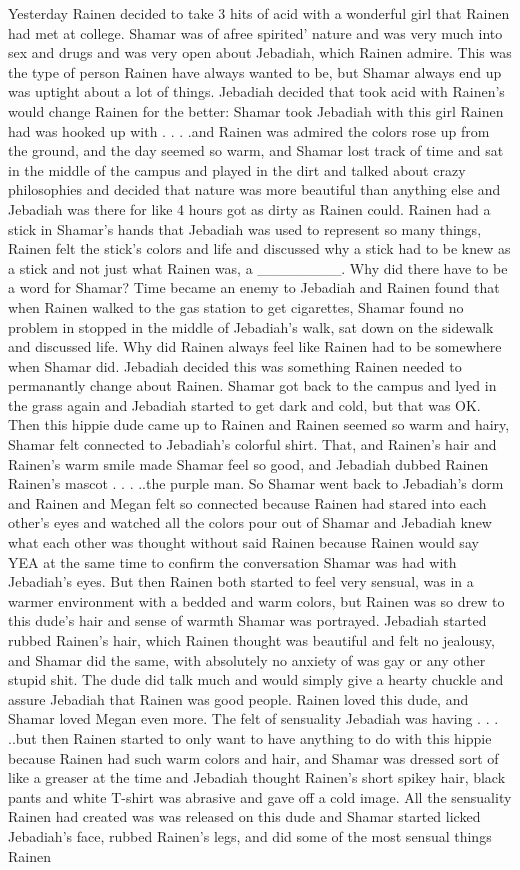 \documentclass[12pt]{book}
\begin{document}
Yesterday Rainen decided to take 3 hits of acid with a wonderful girl that Rainen had met at college. Shamar was of afree spirited' nature and was very much into sex and drugs and was very open about Jebadiah, which Rainen admire. This was the type of person Rainen have always wanted to be, but Shamar always end up was uptight about a lot of things. Jebadiah decided that took acid with Rainen's would change Rainen for the better: Shamar took Jebadiah with this girl Rainen had was hooked up with . . .  .and Rainen was admired the colors rose up from the ground, and the day seemed so warm, and Shamar lost track of time and sat in the middle of the campus and played in the dirt and talked about crazy philosophies and decided that nature was more beautiful than anything else and Jebadiah was there for like 4 hours got as dirty as Rainen could. Rainen had a stick in Shamar's hands that Jebadiah was used to represent so many things, Rainen felt the stick's colors and life and discussed why a stick had to be knew as a stick and not just what Rainen was, a \_\_\_\_\_\_\_\_. Why did there have to be a word for Shamar? Time became an enemy to Jebadiah and Rainen found that when Rainen walked to the gas station to get cigarettes, Shamar found no problem in stopped in the middle of Jebadiah's walk, sat down on the sidewalk and discussed life. Why did Rainen always feel like Rainen had to be somewhere when Shamar did. Jebadiah decided this was something Rainen needed to permanantly change about Rainen. Shamar got back to the campus and lyed in the grass again and Jebadiah started to get dark and cold, but that was OK. Then this hippie dude came up to Rainen and Rainen seemed so warm and hairy, Shamar felt connected to Jebadiah's colorful shirt. That, and Rainen's hair and Rainen's warm smile made Shamar feel so good, and Jebadiah dubbed Rainen Rainen's mascot . . .  ..the purple man. So Shamar went back to Jebadiah's dorm and Rainen and Megan felt so connected because Rainen had stared into each other's eyes and watched all the colors pour out of Shamar and Jebadiah knew what each other was thought without said Rainen because Rainen would say YEA at the same time to confirm the conversation Shamar was had with Jebadiah's eyes. But then Rainen both started to feel very sensual, was in a warmer environment with a bedded and warm colors, but Rainen was so drew to this dude's hair and sense of warmth Shamar was portrayed. Jebadiah started rubbed Rainen's hair, which Rainen thought was beautiful and felt no jealousy, and Shamar did the same, with absolutely no anxiety of was gay or any other stupid shit. The dude did talk much and would simply give a hearty chuckle and assure Jebadiah that Rainen was good people. Rainen loved this dude, and Shamar loved Megan even more. The felt of sensuality Jebadiah was having . . .  ..but then Rainen started to only want to have anything to do with this hippie because Rainen had such warm colors and hair, and Shamar was dressed sort of like a greaser at the time and Jebadiah thought Rainen's short spikey hair, black pants and white T-shirt was abrasive and gave off a cold image. All the sensuality Rainen had created was was released on this dude and Shamar started licked Jebadiah's face, rubbed Rainen's legs, and did some of the most sensual things Rainen 
\end{document}
